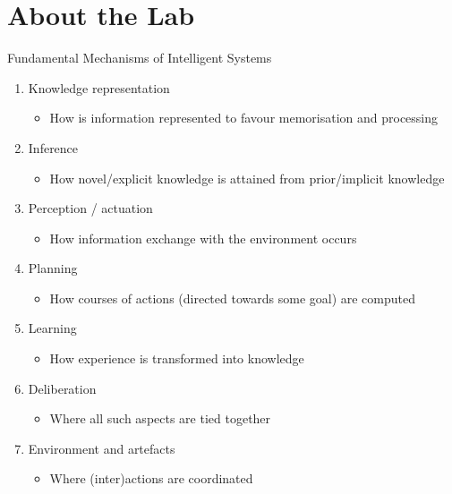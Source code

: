 \documentclass[presentation]{beamer}\mode<presentation>{\usetheme{AMSBolognaFC}}
\begin{document}
\section{About the Lab}

\begin{frame}[c,allowframebreaks]{Fundamental Mechanisms of Intelligent Systems}
%
\begin{enumerate}
	\item Knowledge representation
	\begin{itemize}
		\item How is information represented to favour memorisation and processing
	\end{itemize}
	\item Inference
	\begin{itemize}
		\item How novel/explicit knowledge is attained from prior/implicit knowledge
	\end{itemize}
	\item Perception / actuation
	\begin{itemize}
		\item How information exchange with the environment occurs
	\end{itemize}
	\item Planning
	\begin{itemize}
		\item How courses of actions (directed towards some goal) are computed
	\end{itemize}
	\item Learning
	\begin{itemize}
		\item How experience is transformed into knowledge
	\end{itemize}
	\item Deliberation
	\begin{itemize}
		\item Where all such aspects are tied together
	\end{itemize}
	\item Environment and artefacts
	\begin{itemize}
		\item Where (inter)actions are coordinated
	\end{itemize}
\end{enumerate}

\end{frame}
\end{document}
